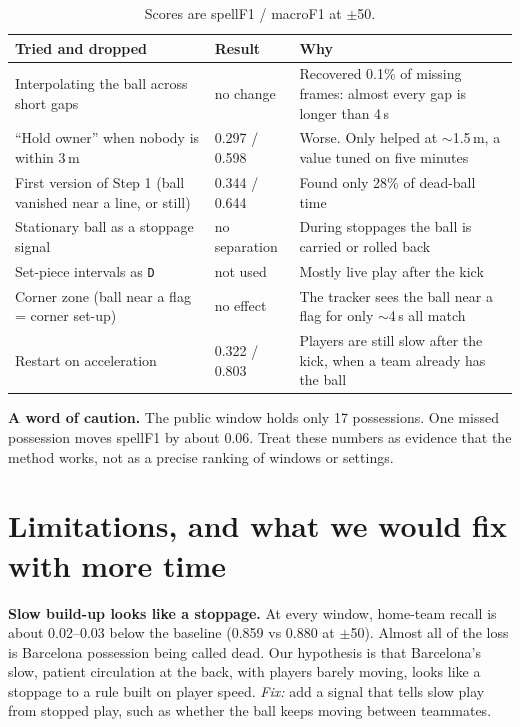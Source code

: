 \documentclass[10pt,a4paper]{article}
\newcommand{\lbl}[1]{\texttt{#1}}
\begin{document}
\begin{table}[h]
\small
\begin{tabularx}{\linewidth}{@{}p{5.6cm}p{2.3cm}Y@{}}
\toprule
\textbf{Tried and dropped} & \textbf{Result} & \textbf{Why} \\
\midrule
Interpolating the ball across short gaps & no change & Recovered 0.1\% of missing frames: almost every gap is longer than 4\,s \\
``Hold owner'' when nobody is within 3\,m & 0.297 / 0.598 & Worse. Only helped at $\sim$1.5\,m, a value tuned on five minutes \\
First version of Step 1 (ball vanished near a line, or still) & 0.344 / 0.644 & Found only 28\% of dead-ball time \\
Stationary ball as a stoppage signal & no separation & During stoppages the ball is carried or rolled back \\
Set-piece intervals as \lbl{D} & not used & Mostly live play after the kick \\
Corner zone (ball near a flag = corner set-up) & no effect & The tracker sees the ball near a flag for only $\sim$4\,s all match \\
Restart on acceleration & 0.322 / 0.803 & Players are still slow after the kick, when a team already has the ball \\
\bottomrule
\end{tabularx}
\caption*{Scores are spellF1 / macroF1 at $\pm$50.}
\end{table}

\begin{callout}
\textbf{A word of caution.} The public window holds only 17 possessions. One missed possession moves spellF1 by
about 0.06. Treat these numbers as evidence that the method works, not as a precise ranking of windows or settings.
\end{callout}

\section{Limitations, and what we would fix with more time}

\textbf{Slow build-up looks like a stoppage.} At every window, home-team recall is about 0.02--0.03 below the
baseline (0.859 vs 0.880 at $\pm$50). Almost all of the loss is Barcelona possession being called dead. Our
hypothesis is that Barcelona's slow, patient circulation at the back, with players barely moving, looks like a
stoppage to a rule built on player speed. \emph{Fix:} add a signal that tells slow play from stopped play, such
as whether the ball keeps moving between teammates.
\end{document}
